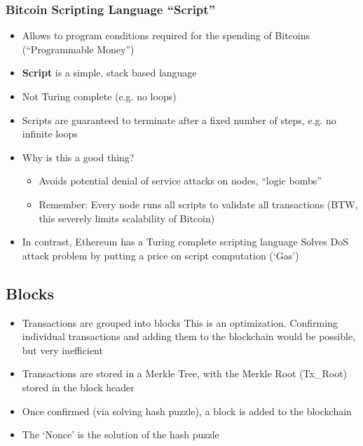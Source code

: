 \subsubsection{Bitcoin Scripting Language ``Script''}
\begin{itemize}
	\item Allows to program conditions required for the spending of Bitcoins (``Programmable Money'')
	\item \textbf{Script} is a simple, stack based language
	\item Not Turing complete (e.g. no loops)
	\item Scripts are guaranteed to terminate after a fixed number of steps, e.g. no infinite loops
	\item Why is this a good thing?
	\begin{itemize}
		\item Avoids potential denial of service attacks on nodes, ``logic bombs''
		\item Remember: Every node runs all scripts to validate all transactions (BTW, this severely limits scalability of Bitcoin)
	\end{itemize}
	\item In contrast, Ethereum has a Turing complete scripting language
	\subitem Solves DoS attack problem by putting a price on script computation (`Gas')
\end{itemize}

\subsection{Blocks}
\begin{itemize}
	\item Transactions are grouped into blocks
	\subitem This is an optimization. Confirming individual transactions and adding them to the blockchain would be possible, but very inefficient
	\item Transactions are stored in a Merkle Tree, with the Merkle Root (Tx\_Root) stored in the block header
	\item Once confirmed (via solving hash puzzle), a block is added to the blockchain
	\item The `Nonce' is the solution of the hash puzzle
\end{itemize}
